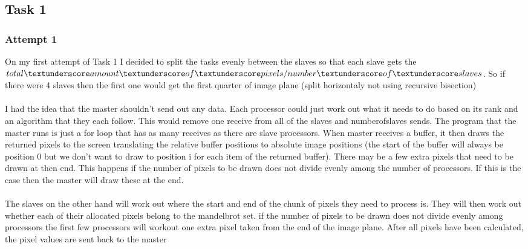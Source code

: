 \documentclass{article}
\begin{document}
    \subsection{Task 1}

        \subsubsection{Attempt 1}
            On my first attempt of Task 1 I decided to split the tasks evenly between the slaves so that each slave gets the 
            \(total\textunderscore amount\textunderscore of\textunderscore pixels / number\textunderscore of\textunderscore slaves\).
            So if there were 4 slaves then the first one would get the first quarter of image plane (split horizontaly not using 
            recursive bisection)
            \\
            \\
            I had the idea that the master shouldn't send out any data. Each processor could just
            work out what it needs to do based on its rank and an algorithm that they each follow. This would remove one receive from all of the slaves
            and number\textunderscore of\textunderscore slaves sends. The program that the master runs is just a for loop that has as many receives as there are slave 
            processors. When master receives a buffer, it then draws the returned pixels to the screen translating the relative buffer
            positions to absolute image positions (the start of the buffer will always be position 0 but we don't want to draw to position i for each item of
            the returned buffer). There may be a few extra pixels that need to be drawn
            at then end. This happens if the number of pixels to be drawn does not divide evenly among the number of processors. If this is the case then
            the master will draw these at the end.
            \\
            \\
            The slaves on the other hand will work out where the start and end of the chunk of pixels they need to process is. They will then
            work out whether each of their allocated pixels belong to the mandelbrot set. if the number of pixels to be drawn does not divide
            evenly among processors the first few processors will workout one extra pixel taken from the end of the image plane. After all pixels
            have been calculated, the pixel values are sent back to the master
\end{document}
